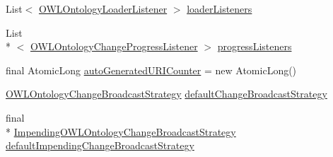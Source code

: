 \begin{DoxyCompactItemize}
\item 
List$<$ \hyperlink{interfaceorg_1_1semanticweb_1_1owlapi_1_1model_1_1_o_w_l_ontology_loader_listener}{O\-W\-L\-Ontology\-Loader\-Listener} $>$ \hyperlink{classuk_1_1ac_1_1manchester_1_1cs_1_1owl_1_1owlapi_1_1_o_w_l_ontology_manager_impl_a748b548522ffc6c197a6e5a85f90659a}{loader\-Listeners}
\item 
List\\*
$<$ \hyperlink{interfaceorg_1_1semanticweb_1_1owlapi_1_1model_1_1_o_w_l_ontology_change_progress_listener}{O\-W\-L\-Ontology\-Change\-Progress\-Listener} $>$ \hyperlink{classuk_1_1ac_1_1manchester_1_1cs_1_1owl_1_1owlapi_1_1_o_w_l_ontology_manager_impl_a0d733f10eea5b23766361f366d5931f1}{progress\-Listeners}
\item 
final Atomic\-Long \hyperlink{classuk_1_1ac_1_1manchester_1_1cs_1_1owl_1_1owlapi_1_1_o_w_l_ontology_manager_impl_a8b778cb0f7964afe105229f81c985d45}{auto\-Generated\-U\-R\-I\-Counter} = new Atomic\-Long()
\item 
\hyperlink{interfaceorg_1_1semanticweb_1_1owlapi_1_1model_1_1_o_w_l_ontology_change_broadcast_strategy}{O\-W\-L\-Ontology\-Change\-Broadcast\-Strategy} \hyperlink{classuk_1_1ac_1_1manchester_1_1cs_1_1owl_1_1owlapi_1_1_o_w_l_ontology_manager_impl_a51f99ef9a32553d916bd823c03bb52da}{default\-Change\-Broadcast\-Strategy}
\item 
final \\*
\hyperlink{interfaceorg_1_1semanticweb_1_1owlapi_1_1model_1_1_impending_o_w_l_ontology_change_broadcast_strategy}{Impending\-O\-W\-L\-Ontology\-Change\-Broadcast\-Strategy} \hyperlink{classuk_1_1ac_1_1manchester_1_1cs_1_1owl_1_1owlapi_1_1_o_w_l_ontology_manager_impl_acb09b7f6254d69ec9eefc36bad651361}{default\-Impending\-Change\-Broadcast\-Strategy}
\end{DoxyCompactItemize}
